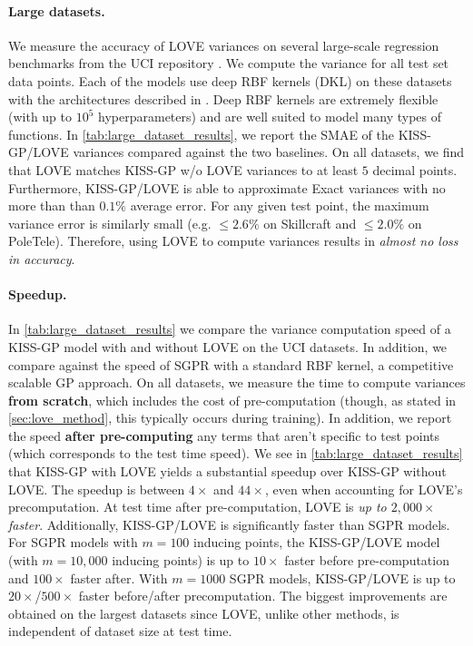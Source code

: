 \paragraph{Large datasets.}
We measure the accuracy of LOVE{} variances on several large-scale regression benchmarks from the UCI repository \cite{asuncion2007uci}.
We compute the variance for all test set data points.
Each of the models use deep RBF kernels (DKL) on these datasets with the architectures described in \cite{wilson2016deep}.
Deep RBF kernels are extremely flexible (with up to $10^5$ hyperparameters) and are well suited to model many types of functions.
In \cref{tab:large_dataset_results}, we report the SMAE of the KISS-GP/LOVE{} variances compared against the two baselines.
On all datasets, we find that LOVE{} matches KISS-GP w/o LOVE{} variances to at least $5$ decimal points.
Furthermore, KISS-GP/LOVE{} is able to approximate Exact variances with no more than than $0.1\%$ average error.
For any given test point, the maximum variance error is similarly small (e.g. $\leq \! 2.6\%$ on Skillcraft and $\leq \! 2.0\%$ on PoleTele).
Therefore, using LOVE{} to compute variances results in \emph{almost no loss in accuracy}.

\paragraph{Speedup.}
In \cref{tab:large_dataset_results} we compare the variance computation speed of a KISS-GP model with and without LOVE{} on the UCI datasets.
In addition, we compare against the speed of SGPR with a standard RBF kernel, a competitive scalable GP approach.
On all datasets, we measure the time to compute variances {\bf from scratch}, which includes the cost of pre-computation (though, as stated in \cref{sec:love_method}, this typically occurs during training).
In addition, we report the speed {\bf after pre-computing} any terms that aren't specific to test points (which corresponds to the test time speed).
We see in \cref{tab:large_dataset_results} that KISS-GP with LOVE{} yields a substantial speedup over KISS-GP without LOVE{}.
The speedup is between $4\times$ and $44\times$, even when accounting for LOVE{}'s precomputation.
At test time after pre-computation, LOVE{} is \emph{up to $2,\!000\times$ faster}.
Additionally, KISS-GP/LOVE{} is significantly faster than SGPR models.
For SGPR models with $m=100$ inducing points, the KISS-GP/LOVE{} model (with $m=10,\!000$ inducing points) is up to $10\times$ faster before pre-computation and $100\times$ faster after.
With $m=1000$ SGPR models, KISS-GP/LOVE{} is up to $20\times$/$500\times$ faster before/after precomputation.
The biggest improvements are obtained on the largest datasets since LOVE{}, unlike other methods, is independent of dataset size at test time.

